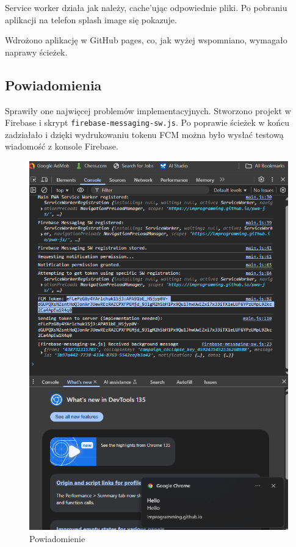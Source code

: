 \documentclass[a4paper,12pt]{article}
\begin{document}
Service worker działa jak należy, cache'ując odpowiednie pliki. Po pobraniu aplikacji na telefon splash image się pokazuje.

Wdrożono aplikację w GitHub pages, co, jak wyżej wspomniano, wymagało naprawy ścieżek.

\subsection{Powiadomienia}

Sprawiły one najwięcej problemów implementacyjnych. Stworzono projekt w Firebase i skrypt \texttt{firebase-messaging-sw.js}. Po poprawie ścieżek w końcu zadziałało i dzięki wydrukowaniu tokenu FCM można było wysłać testową wiadomość z konsole Firebase.

\begin{figure}[H]
    \centering
    \includegraphics[width=1\textwidth]{images/notification.png}
    \caption{Powiadomienie}
\end{figure}
\end{document}
